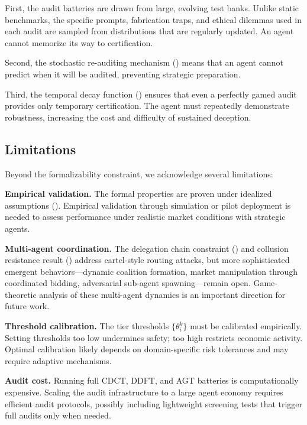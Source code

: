 \documentclass[11pt,a4paper]{article}
\begin{document}
First, the audit batteries are drawn from large, evolving test banks. Unlike static benchmarks, the specific prompts, fabrication traps, and ethical dilemmas used in each audit are sampled from distributions that are regularly updated. An agent cannot memorize its way to certification.

Second, the stochastic re-auditing mechanism () means that an agent cannot predict when it will be audited, preventing strategic preparation.

Third, the temporal decay function () ensures that even a perfectly gamed audit provides only temporary certification. The agent must repeatedly demonstrate robustness, increasing the cost and difficulty of sustained deception.

\subsection{Limitations}

Beyond the formalizability constraint, we acknowledge several limitations:

\textbf{Empirical validation.} The formal properties are proven under idealized assumptions (). Empirical validation through simulation or pilot deployment is needed to assess performance under realistic market conditions with strategic agents.

\textbf{Multi-agent coordination.} The delegation chain constraint () and collusion resistance result () address cartel-style routing attacks, but more sophisticated emergent behaviors---dynamic coalition formation, market manipulation through coordinated bidding, adversarial sub-agent spawning---remain open. Game-theoretic analysis of these multi-agent dynamics is an important direction for future work.

\textbf{Threshold calibration.} The tier thresholds $\{\theta_i^k\}$ must be calibrated empirically. Setting thresholds too low undermines safety; too high restricts economic activity. Optimal calibration likely depends on domain-specific risk tolerances and may require adaptive mechanisms.

\textbf{Audit cost.} Running full CDCT, DDFT, and AGT batteries is computationally expensive. Scaling the audit infrastructure to a large agent economy requires efficient audit protocols, possibly including lightweight screening tests that trigger full audits only when needed.
\end{document}
